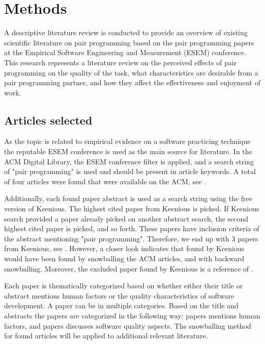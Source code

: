 \documentclass[conference]{IEEEtran}
\begin{document}
\section{Methods}

A descriptive literature review is conducted to provide an overview of existing scientific literature on pair programming based on the pair programming papers at the Empirical Software Engineering and Measurement (ESEM) conference. This research represents a literature review on the perceived effects of pair programming on the quality of the task, what characteristics are desirable from a pair programming partner, and how they affect the effectiveness and enjoyment of work. 

\subsection{Articles selected}

As the topic is related to empirical evidence on a software practicing technique the reputable ESEM conference is used as the main source for literature. In the ACM Digital Library, the ESEM conference filter is applied, and a search string of "pair programming" is used and should be present in article keywords. A total of four articles were found that were available on the ACM, see \cite{10.1145/2652524.2652529, 10.1145/1414004.1414026, 10.1145/1852786.1852816, 10.1145/1159733.1159749}.

Additionally, each found paper abstract is used as a search string using the free version of Keenious. The highest cited paper from Keenious is picked. If Keenious search provided a paper already picked on another abstract search, the second highest cited paper is picked, and so forth. These papers have inclusion criteria of the abstract mentioning "pair programming". Therefore, we end up with 3 papers from Keenious, see \cite{Williams2000Strengthening, Arisholm2007Evaluating, Hannay2009effectiveness}. However, a closer look indicates that \cite{Williams2000Strengthening, Arisholm2007Evaluating} found by Keenious would have been found by snowballing the ACM articles, and \cite{Hannay2009effectiveness} with backward snowballing. Moreover, the excluded paper \cite{ChamorroPremuzic2003Personality} found by Keenious is a reference of \cite{10.1145/1852786.1852816}.

Each paper is thematically categorized based on whether either their title or abstract mentions human factors or the quality characteristics of software development. A paper can be in multiple categories. Based on the title and abstracts the papers are categorized in the following way: papers \cite{10.1145/2652524.2652529, Williams2000Strengthening, 10.1145/1414004.1414026, Arisholm2007Evaluating, 10.1145/1852786.1852816} mentions human factors, and papers \cite{Williams2000Strengthening, 10.1145/1414004.1414026, Arisholm2007Evaluating, 10.1145/1159733.1159749, Hannay2009effectiveness} discusses software quality aspects. The snowballing method for found articles will be applied to additional relevant literature.
\end{document}
